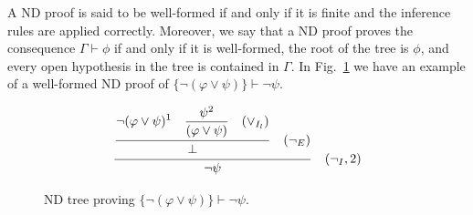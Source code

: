 A ND proof is said to be well-formed if and only if it is finite and the inference rules are applied correctly. Moreover, we say that a ND proof proves the consequence \(\Gamma \vdash \phi\) if and only if it is well-formed, the root of the tree is \(\phi\), and every open hypothesis in the tree is contained in \(\Gamma\).
In Fig.~\ref{tab:proof-tree} we have an example of a well-formed ND proof of \( \{\neg (\varphi \lor \psi)\} \vdash \neg \psi \).

\begin{figure}[h]
    \centering
    \[
    \frac{\displaystyle \frac{
    \displaystyle \neg (\varphi \lor \psi)^1 \quad \displaystyle \frac{\psi^2}{(\varphi \lor \psi) \strut} \quad (\lor_{I_l}) \strut}
    {\displaystyle \bot \strut} \quad (\displaystyle \neg_E)\strut} {\displaystyle \neg \psi \strut} \quad (\neg_I, 2)
    \]
    \caption{ND tree proving \( \{\neg (\varphi \lor \psi)\} \vdash \neg \psi \).}
    \label{tab:proof-tree}
\end{figure}


%
